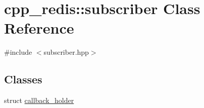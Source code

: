 \hypertarget{classcpp__redis_1_1subscriber}{}\section{cpp\+\_\+redis\+:\+:subscriber Class Reference}
\label{classcpp__redis_1_1subscriber}


{\ttfamily \#include $<$subscriber.\+hpp$>$}

\subsection*{Classes}
\begin{DoxyCompactItemize}
\item 
struct \hyperlink{structcpp__redis_1_1subscriber_1_1callback__holder}{callback\+\_\+holder}
\end{DoxyCompactItemize}

